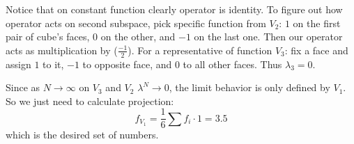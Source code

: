 \documentclass{amsart}
\begin{document}
Notice that on constant function clearly operator is identity. To figure out how operator acts on second subspace, pick specific function from $V_2$: $1$ on the first pair of cube's faces, $0$ on the other, and $-1$ on the last one. Then our operator acts as multiplication by ($\frac{-1}{2}$).
For a representative of function $V_3$: fix a face and assign $1$ to it, $-1$ to opposite face, and $0$ to all other faces. Thus $\lambda_3 = 0$.

Since as $N \to \infty$ on $V_3$ and $V_2$ $\lambda^N \to 0$, the limit behavior is only defined by $V_1$. So we just need to calculate projection:
$$ f_{V_1} = \frac{1}{6} \sum {f_i \cdot 1} = 3.5$$
which is the desired set of numbers.

\nocite{serr}
\nocite{vinberg2003course}
\nocite{meliot2017representation}
\printbibliography
\end{document}
